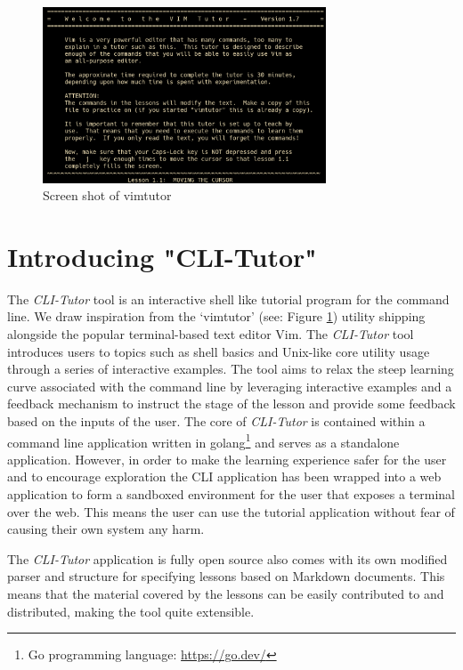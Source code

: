 \begin{figure}[htbp]
	\centering
	\includegraphics[width=0.75\textwidth]{img/vimtutor}
	\caption{Screen shot of vimtutor}
    \label{fig:vimtutor}
\end{figure}

\section{Introducing "CLI-Tutor"}

The \textit{CLI-Tutor} tool is an interactive shell like tutorial program for
the command line. We draw inspiration from the
`vimtutor'\cite{pierce_ware_smith_moolenaar_2019} (see: Figure
\ref{fig:vimtutor}) utility shipping alongside the popular terminal-based text
editor Vim. The \textit{CLI-Tutor} tool introduces users to topics such as
shell basics and Unix-like core utility usage through a series of interactive
examples. The tool aims to relax the steep learning curve associated with the
command line by leveraging interactive examples and a feedback mechanism to
instruct the stage of the lesson and provide some feedback based on the inputs
of the user. The core of \textit{CLI-Tutor} is contained within a command line
application written in golang\footnote{Go programming language:
\href{https://go.dev/}{https://go.dev/}} and serves as a standalone
application. However, in order to make the learning experience safer for the
user and to encourage exploration the CLI application has been wrapped into a
web application to form a sandboxed environment for the user that exposes a
terminal over the web. This means the user can use the tutorial application
without fear of causing their own system any harm. 

The \textit{CLI-Tutor} application is fully open source also comes with its own
modified parser and structure for specifying lessons based on Markdown
documents. This means that the material covered by the lessons can be easily
contributed to and distributed, making the tool quite extensible.


